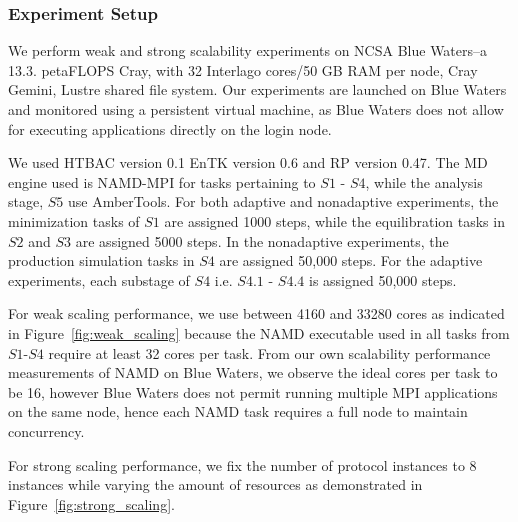 
\subsubsection{Experiment Setup}\label{ssec:exp_design}

We perform weak and strong scalability experiments on NCSA Blue Waters--a
13.3. petaFLOPS Cray, with 32 Interlago cores/50 GB RAM per node, Cray Gemini,
Lustre shared file system. Our experiments are launched on Blue Waters and
monitored using a persistent virtual machine, as Blue Waters does not allow
for executing applications directly on the login node.

We used HTBAC version 0.1 EnTK version 0.6 and RP version 0.47. The MD engine
used is NAMD-MPI for tasks pertaining to $S1$ - $S4$, while the analysis
stage, $S5$ use AmberTools. For both adaptive and nonadaptive experiments, the
minimization tasks of $S1$ are assigned 1000 steps, while the equilibration
tasks in $S2$ and $S3$ are assigned 5000 steps. In the nonadaptive
experiments, the production simulation tasks in $S4$ are assigned 50,000
steps. For the adaptive experiments, each substage of $S4$ i.e. $S4.1$ -
$S4.4$ is assigned 50,000 steps.


For weak scaling performance, we use between 4160 and 33280 cores as indicated 
in Figure~\ref{fig:weak_scaling} because the NAMD executable used in all tasks
from $S1$-$S4$ require at least 32 cores per task. From our own scalability
performance measurements of NAMD on Blue Waters, we observe the ideal cores
per task to be 16, however Blue Waters does not permit running multiple MPI
applications on the same node, hence each NAMD task requires a full node to
maintain concurrency.

For strong scaling performance, we fix the number of protocol instances to 
8 instances while varying the amount of resources as demonstrated in 
Figure~\ref{fig:strong_scaling}. 

